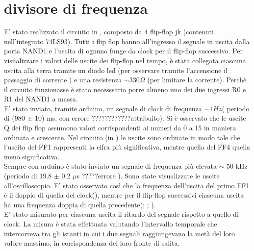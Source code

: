 \section{divisore di frequenza}
E' stato realizzato il circuito in , composto da 4 flip-flop jk (contenuti nell'integrato 74LS93). Tutti i flip flop hanno all'ingresso il segnale in uscita dalla porta NAND1 e l'uscita di ognuno funge da clock per il flip-flop successivo.
Per visualizzare i valori delle uscite dei flip-flop nel tempo, è stata collegata ciascuna uscita alla terra tramite un diodo led (per osservare tramite l'accensione il passaggio di corrente ) e una resistenza $\sim 330 \Omega$ (per limitare la corrente). Perchè il circuito funzionasse è stato necesssario porre almeno uno dei due ingressi R0 e R1 del NAND1 a massa.\\
E' stato inviato, tramite arduino, un segnale di clock di frequenza $\sim 1 Hz$( periodo di (980 $\pm$ 10) ms, con errore ????????????attribuito). Si è osservato che le uscite Q dei flip flop assumono valori corrispondenti ai numeri da 0 a 15 in maniera ordinata e crescente. Nel circuito (in  ) le uscite sono ordinate in modo tale che l'uscita del FF1 rappresenti la cifra più significativa, mentre  quella del FF4 quella meno significativa.\\
Sempre con arduino è stato inviato un segnale di frequenza più elevata $\sim$ 50 kHz (periodo di 19.8 $\pm$ 0.2 $\mu$s ?????errore ). Sono state visualizzate le uscite all'oscilloscopio. E' stato osservato così che la frequenza dell'uscita del primo FF1 è il doppio di quella del clock(), mentre per il flip-flop successivi ciascuna uscita ha una frequenza doppia di quella precedente(; ; ).\\
E' stato misurato per ciascuna uscita il ritardo del segnale rispetto a quello di clock. La misura è stata effettuata valutando l'intervallo temporale che intercorreva tra gli istanti in cui i due segnali raggiungevano la metà del loro valore massimo, in corrispondenza del loro fronte di salita.\\

